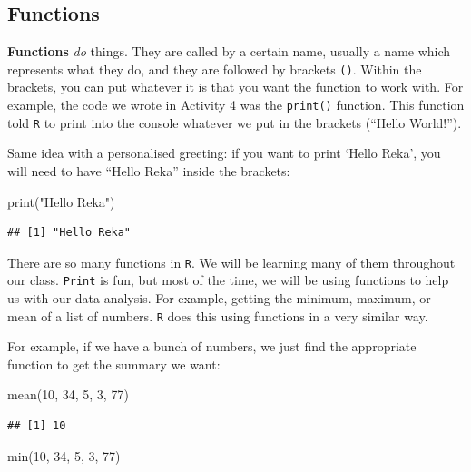 \documentclass[
]{book}
\newenvironment{Shaded}{\begin{snugshade}}{\end{snugshade}}
\newcommand{\DecValTok}[1]{\textcolor[rgb]{0.00,0.00,0.81}{#1}}
\newcommand{\FunctionTok}[1]{\textcolor[rgb]{0.00,0.00,0.00}{#1}}
\newcommand{\NormalTok}[1]{#1}
\newcommand{\StringTok}[1]{\textcolor[rgb]{0.31,0.60,0.02}{#1}}
\begin{document}
\hypertarget{functions}{%
\subsection{Functions}\label{functions}}

\textbf{Functions} \emph{do} things. They are called by a certain name, usually a name which represents what they do, and they are followed by brackets \texttt{()}. Within the brackets, you can put whatever it is that you want the function to work with. For example, the code we wrote in Activity 4 was the \texttt{print()} function. This function told \texttt{R} to print into the console whatever we put in the brackets (``Hello World!'').

Same idea with a personalised greeting: if you want to print `Hello Reka', you will need to have ``Hello Reka'' inside the brackets:

\begin{Shaded}
\begin{Highlighting}[]
\FunctionTok{print}\NormalTok{(}\StringTok{"Hello Reka"}\NormalTok{)}
\end{Highlighting}
\end{Shaded}

\begin{verbatim}
## [1] "Hello Reka"
\end{verbatim}

There are so many functions in \texttt{R}. We will be learning many of them throughout our class. \texttt{Print} is fun, but most of the time, we will be using functions to help us with our data analysis. For example, getting the minimum, maximum, or mean of a list of numbers. \texttt{R} does this using functions in a very similar way.

For example, if we have a bunch of numbers, we just find the appropriate function to get the summary we want:

\begin{Shaded}
\begin{Highlighting}[]
\FunctionTok{mean}\NormalTok{(}\DecValTok{10}\NormalTok{, }\DecValTok{34}\NormalTok{, }\DecValTok{5}\NormalTok{, }\DecValTok{3}\NormalTok{, }\DecValTok{77}\NormalTok{)}
\end{Highlighting}
\end{Shaded}

\begin{verbatim}
## [1] 10
\end{verbatim}

\begin{Shaded}
\begin{Highlighting}[]
\FunctionTok{min}\NormalTok{(}\DecValTok{10}\NormalTok{, }\DecValTok{34}\NormalTok{, }\DecValTok{5}\NormalTok{, }\DecValTok{3}\NormalTok{, }\DecValTok{77}\NormalTok{)}
\end{Highlighting}
\end{Shaded}
\end{document}

